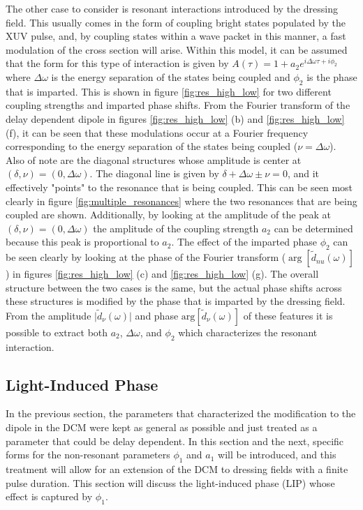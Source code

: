 The other case to consider is resonant interactions introduced by the dressing field.  This usually comes in the form of coupling bright states populated by the XUV pulse, and, by coupling states within a wave packet in this manner, a fast modulation of the cross section will arise.  Within this model, it can be assumed that the form for this type of interaction is given by $A(\tau)=1+a_2e^{i\Delta\omega\tau+i\phi_2}$ where $\Delta\omega$ is the energy separation of the states being coupled and $\phi_2$ is the phase that is imparted. This is shown in figure \ref{fig:res_high_low} for two different coupling strengths and imparted phase shifts.  From the Fourier transform of the delay dependent dipole in figures \ref{fig:res_high_low} (b) and \ref{fig:res_high_low} (f), it can be seen that these modulations occur at a Fourier frequency corresponding to the energy separation of the states being coupled ($\nu=\Delta\omega$).  Also of note are the diagonal structures whose amplitude is center at $(\delta,\nu)=(0,\Delta\omega)$.  The diagonal line is given by $\delta+\Delta\omega\pm\nu=0$, and it effectively "points" to the resonance that is being coupled.  This can be seen most clearly in figure \ref{fig:multiple_resonances} where the two resonances that are being coupled are shown.  Additionally, by looking at the amplitude of the peak at $(\delta,\nu)=(0,\Delta\omega)$ the amplitude of the coupling strength $a_2$ can be determined because this peak is proportional to $a_2$.  The effect of the imparted phase $\phi_2$ can be seen clearly by looking at the phase of the Fourier transform ($\arg[\tilde{d}_{nu}(\omega)]$) in figures \ref{fig:res_high_low} (c) and \ref{fig:res_high_low} (g).  The overall structure between the two cases is the same, but the actual phase shifts across these structures is modified by the phase that is imparted by the dressing field.  From the amplitude $\rvert\tilde{d}_\nu(\omega)\lvert$ and phase $\mathrm{arg}[\tilde{d}_\nu(\omega)]$ of these features it is possible to extract both $a_2$, $\Delta\omega$, and $\phi_2$ which characterizes the resonant interaction.



\subsection{Light-Induced Phase}
\label{sec:LIP}
In the previous section, the parameters that characterized the modification to the dipole in the DCM were kept as general as possible and just treated as a parameter that could be delay dependent.  In this section and the next, specific forms for the non-resonant parameters $\phi_1$ and $a_1$ will be introduced, and this treatment will allow for an extension of the DCM to dressing fields with a finite pulse duration.  This section will discuss the light-induced phase (LIP) whose effect is captured by $\phi_1$. 

